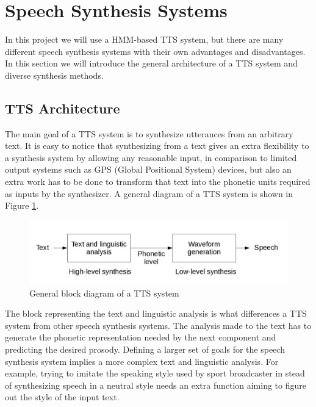 \section{Speech Synthesis Systems}
\label{speec_synthesis_systems}
In this project we will use a HMM-based TTS system, but there are many different speech synthesis systems with their own advantages and disadvantages. In this section we will introduce the general architecture of a TTS system and diverse synthesis methods.

\subsection{TTS Architecture}
\label{speech_synthesis_systems_tts}
The main goal of a TTS system is to synthesize utterances from an arbitrary text. It is easy to notice that synthesizing from a text gives an extra flexibility to a synthesis system by allowing any reasonable input, in comparison to limited output systems such as GPS (Global Positional System) devices, but also an extra work has to be done to transform that text into the phonetic units required as inputs by the synthesizer. A general diagram of a TTS system is shown in Figure \ref{fig:tts_architecture}.

\begin{figure}[htb]
	\begin{center}
	\includegraphics[width=\textwidth]{images/tts_architecture.jpg}
	\caption{General block diagram of a TTS system \cite{TuomoMSc}}
	\label{fig:tts_architecture}
	\end{center}
\end{figure}

The block representing the text and linguistic analysis is what differences a TTS system from other speech synthesis systems. The analysis made to the text has to generate the phonetic representation needed by the next component and predicting the desired prosody. Defining a larger set of goals for the speech synthesis system implies a more complex text and linguistic analysis. For example, trying to imitate the speaking style used by sport broadcaster in stead of synthesizing speech in a neutral style needs an extra function aiming to figure out the style of the input text.

